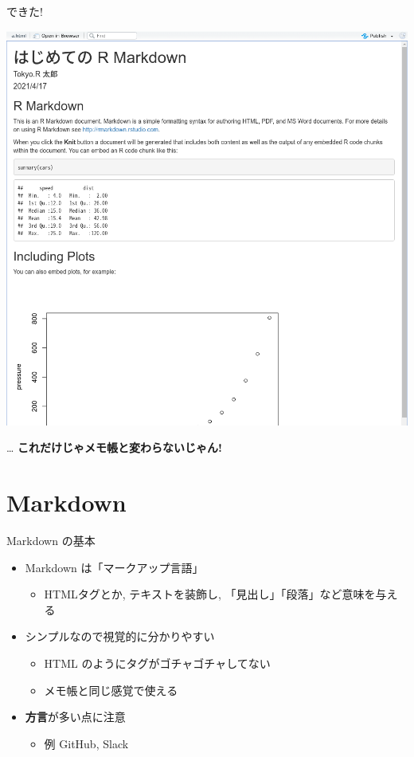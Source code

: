 \documentclass[
  ignorenonframetext,
]{beamer}
\providecommand{\tightlist}{%
  \setlength{\itemsep}{0pt}\setlength{\parskip}{0pt}}
\begin{document}
\begin{frame}{できた!}
\protect\hypertarget{ux3067ux304dux305f}{}
\begin{center}\includegraphics[width=1\linewidth,height=1\textheight,keepaspectratio]{img/plain-document} \end{center}

\ldots{} \textbf{これだけじゃメモ帳と変わらないじゃん!}
\end{frame}

\hypertarget{markdown}{%
\section{Markdown}\label{markdown}}

\begin{frame}{Markdown の基本}
\protect\hypertarget{markdown-ux306eux57faux672c}{}
\begin{itemize}
\item
  Markdown は「マークアップ言語」

  \begin{itemize}
  \tightlist
  \item
    HTMLタグとか, テキストを装飾し,
    「見出し」「段落」など意味を与える
  \end{itemize}
\item
  シンプルなので視覚的に分かりやすい

  \begin{itemize}
  \tightlist
  \item
    HTML のようにタグがゴチャゴチャしてない
  \item
    メモ帳と同じ感覚で使える
  \end{itemize}
\item
  \textbf{方言}が多い点に注意

  \begin{itemize}
  \tightlist
  \item
    例 GitHub, Slack
  \end{itemize}
\end{itemize}
\end{frame}
\end{document}
